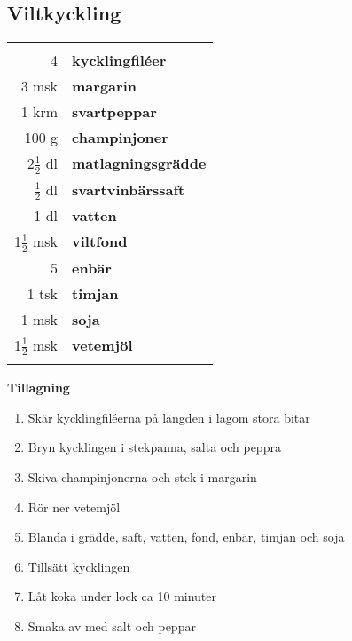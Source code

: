 \clearpage

\subsection{Viltkyckling}

\begin{table}[H]
	\begin{tabular}{rl}
	\hline
	&\\
		4 & \textbf{kycklingfiléer}\\
		3 msk & \textbf{margarin}\\
		1 krm & \textbf{svartpeppar}\\
		100 g & \textbf{champinjoner}\\
		2$\frac{1}{2}$ dl & \textbf{matlagningsgrädde}\\
		$\frac{1}{2}$ dl & \textbf{svartvinbärssaft}\\
		1 dl & \textbf{vatten}\\
		1$\frac{1}{2}$ msk & \textbf{viltfond}\\
		5 & \textbf{enbär}\\
		1 tsk & \textbf{timjan}\\
		1 msk & \textbf{soja}\\
		1$\frac{1}{2}$ msk & \textbf{vetemjöl}\\
	&\\
	\hline
	\end{tabular}
\end{table}


\begin{multicols*}{2}

\noindent \textbf{Tillagning}
\begin{enumerate}
	\itemsep0cm
	\item Skär kycklingfiléerna på \mbox{längden} i lagom stora bitar
	\item Bryn kycklingen i stekpanna, salta och peppra
	\item Skiva champinjonerna och stek i margarin
	\item Rör ner vetemjöl
	\item Blanda i grädde, saft, vatten, fond, enbär, timjan och soja
	\item Tillsätt kycklingen
	\item Låt koka under lock ca 10 \mbox{minuter}
	\item Smaka av med salt och peppar
\end{enumerate}

\end{multicols*}


